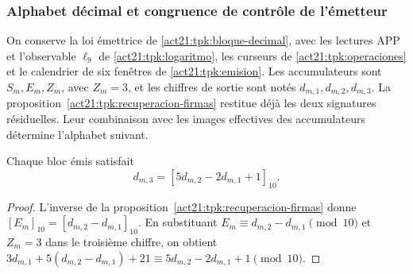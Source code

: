 \subsubsection{Alphabet décimal et congruence de contrôle de l'émetteur}
\label{sec:rec27-codigo}

On conserve la loi émettrice de \eqref{act21:tpk:bloque-decimal},
avec les lectures APP et l'observable \(\ell_9\) de
\eqref{act21:tpk:logaritmo}, les curseurs de
\ref{act21:tpk:operaciones} et le calendrier de six fenêtres de
\ref{act21:tpk:emision}. Les accumulateurs sont \(S_m,E_m,Z_m\), avec
\(Z_m=3\), et les chiffres de sortie sont notés \(d_{m,1},d_{m,2},d_{m,3}\).
La proposition~\ref{act21:tpk:recuperacion-firmas} restitue déjà les deux
signatures résiduelles. Leur combinaison avec les images effectives des
accumulateurs détermine l'alphabet suivant.

\begin{proposition}
Chaque bloc émis satisfait
\[
 d_{m,3}=[5d_{m,2}-2d_{m,1}+1]_{10}.
\]
\end{proposition}
\begin{proof}
L'inverse de la proposition~\ref{act21:tpk:recuperacion-firmas}
donne \([E_m]_{10}=[d_{m,2}-d_{m,1}]_{10}\). En substituant
$E_m\equiv d_{m,2}-d_{m,1}\pmod{10}$ et $Z_m=3$ dans le troisième chiffre, on obtient
$3d_{m,1}+5(d_{m,2}-d_{m,1})+21\equiv5d_{m,2}-2d_{m,1}+1\pmod{10}$.
\end{proof}

